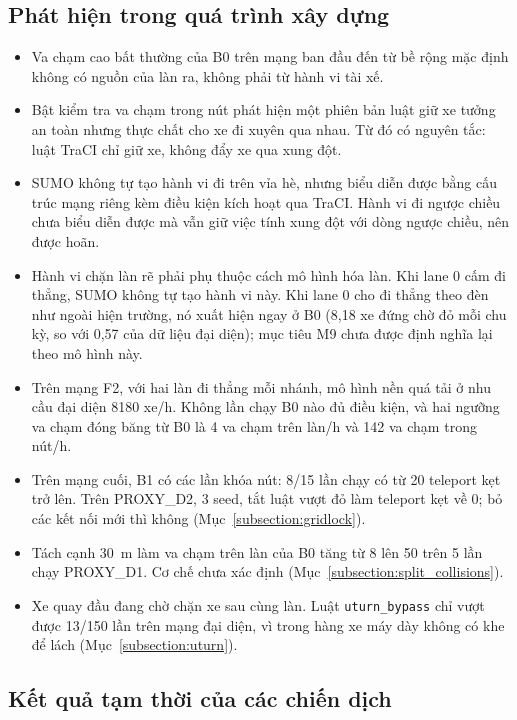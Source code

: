 \documentclass[../DoAn.tex]{subfiles}
\begin{document}
\subsection{Phát hiện trong quá trình xây dựng}

\begin{itemize}
    \item Va chạm cao bất thường của B0 trên mạng ban đầu đến từ bề rộng mặc định không có nguồn của làn ra, không phải từ hành vi tài xế.
    \item Bật kiểm tra va chạm trong nút phát hiện một phiên bản luật giữ xe tưởng an toàn nhưng thực chất cho xe đi xuyên qua nhau. Từ đó có nguyên tắc: luật TraCI chỉ giữ xe, không đẩy xe qua xung đột.
    \item SUMO không tự tạo hành vi đi trên vỉa hè, nhưng biểu diễn được bằng cấu trúc mạng riêng kèm điều kiện kích hoạt qua TraCI. Hành vi đi ngược chiều chưa biểu diễn được mà vẫn giữ việc tính xung đột với dòng ngược chiều, nên được hoãn.
    \item Hành vi chặn làn rẽ phải phụ thuộc cách mô hình hóa làn. Khi lane 0 cấm đi thẳng, SUMO không tự tạo hành vi này. Khi lane 0 cho đi thẳng theo đèn như ngoài hiện trường, nó xuất hiện ngay ở B0 (8,18 xe đứng chờ đỏ mỗi chu kỳ, so với 0,57 của dữ liệu đại diện); mục tiêu M9 chưa được định nghĩa lại theo mô hình này.
    \item Trên mạng F2, với hai làn đi thẳng mỗi nhánh, mô hình nền quá tải ở nhu cầu đại diện 8180 xe/h. Không lần chạy B0 nào đủ điều kiện, và hai ngưỡng va chạm đóng băng từ B0 là 4 va chạm trên làn/h và 142 va chạm trong nút/h.
    \item Trên mạng cuối, B1 có các lần khóa nút: 8/15 lần chạy có từ 20 teleport kẹt trở lên. Trên PROXY\_D2, 3 seed, tắt luật vượt đỏ làm teleport kẹt về 0; bỏ các kết nối mới thì không (Mục~\ref{subsection:gridlock}).
    \item Tách cạnh 30~m làm va chạm trên làn của B0 tăng từ 8 lên 50 trên 5 lần chạy PROXY\_D1. Cơ chế chưa xác định (Mục~\ref{subsection:split_collisions}).
    \item Xe quay đầu đang chờ chặn xe sau cùng làn. Luật \texttt{uturn\_bypass} chỉ vượt được 13/150 lần trên mạng đại diện, vì trong hàng xe máy dày không có khe để lách (Mục~\ref{subsection:uturn}).
\end{itemize}

\subsection{Kết quả tạm thời của các chiến dịch}
\end{document}
